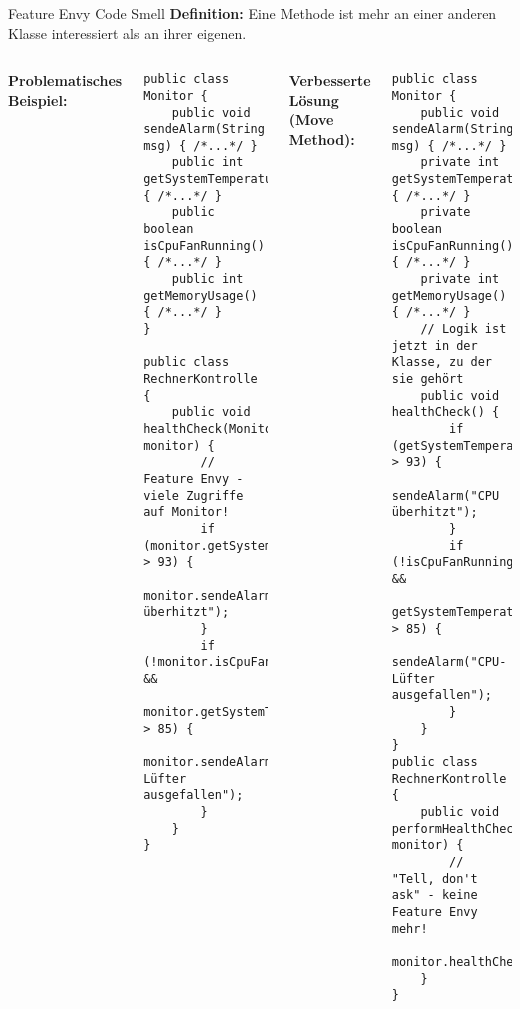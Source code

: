 \begin{frame}[fragile]{Feature Envy Code Smell}
  \textbf{Definition:} Eine Methode ist mehr an einer anderen Klasse interessiert als an ihrer eigenen.
  \begin{columns}[T]
    \textbf{Problematisches Beispiel:}
    \begin{lstlisting}[style=java, basicstyle=\tiny\ttfamily]
public class Monitor {
    public void sendeAlarm(String msg) { /*...*/ }
    public int getSystemTemperatur() { /*...*/ }
    public boolean isCpuFanRunning() { /*...*/ }
    public int getMemoryUsage() { /*...*/ }
}

public class RechnerKontrolle {
    public void healthCheck(Monitor monitor) {
        // Feature Envy - viele Zugriffe auf Monitor!
        if (monitor.getSystemTemperatur() > 93) {
            monitor.sendeAlarm("CPU überhitzt");
        }
        if (!monitor.isCpuFanRunning() &&
            monitor.getSystemTemperatur() > 85) {
            monitor.sendeAlarm("CPU-Lüfter ausgefallen");
        }
    }
}
    \end{lstlisting}
    \textbf{Verbesserte Lösung (Move Method):}
    \begin{lstlisting}[style=java, basicstyle=\tiny\ttfamily]
public class Monitor {
    public void sendeAlarm(String msg) { /*...*/ }
    private int getSystemTemperatur() { /*...*/ }
    private boolean isCpuFanRunning() { /*...*/ }
    private int getMemoryUsage() { /*...*/ }
    // Logik ist jetzt in der Klasse, zu der sie gehört
    public void healthCheck() {
        if (getSystemTemperatur() > 93) {
            sendeAlarm("CPU überhitzt");
        }
        if (!isCpuFanRunning() &&
            getSystemTemperatur() > 85) {
            sendeAlarm("CPU-Lüfter ausgefallen");
        }
    }
}
public class RechnerKontrolle {
    public void performHealthCheck(Monitor monitor) {
        // "Tell, don't ask" - keine Feature Envy mehr!
        monitor.healthCheck();
    }
}
    \end{lstlisting}
  \end{columns}
\end{frame}

